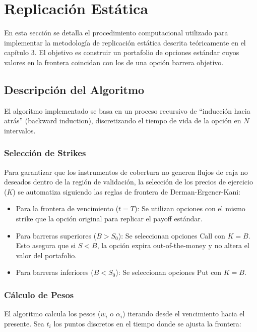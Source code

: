 \section{Replicación Estática}
\label{sec:impl_replicacion}

En esta sección se detalla el procedimiento computacional utilizado para implementar la metodología de replicación estática descrita teóricamente en el capítulo 3. El objetivo es construir un portafolio de opciones estándar cuyos valores en la frontera coincidan con los de una opción barrera objetivo.

\subsection{Descripción del Algoritmo}

El algoritmo implementado se basa en un proceso recursivo de ``inducción hacia atrás'' (backward induction), discretizando el tiempo de vida de la opción en $N$ intervalos.

\subsubsection*{Selección de Strikes} 

Para garantizar que los instrumentos de cobertura no generen flujos de caja no deseados dentro de la región de validación, la selección de los precios de ejercicio ($K$) se automatiza siguiendo las reglas de frontera de Derman-Ergener-Kani:

\begin{itemize} 
  \item Para la frontera de vencimiento ($t=T$): Se utilizan opciones con el mismo strike que la opción original para replicar el payoff estándar.
  
  \item Para barreras superiores ($B>S_0$): Se seleccionan opciones Call con $K=B$. Esto asegura que si $S<B$, la opción expira out-of-the-money y no altera el valor del portafolio.
  
  \item Para barreras inferiores ($B<S_0$): Se seleccionan opciones Put con $K=B$. 
\end{itemize}

\subsubsection*{Cálculo de Pesos} 

El algoritmo calcula los pesos ($w_i$ o $\alpha_i$) iterando desde el vencimiento hacia el presente. Sea $t_i$ los puntos discretos en el tiempo donde se ajusta la frontera:

